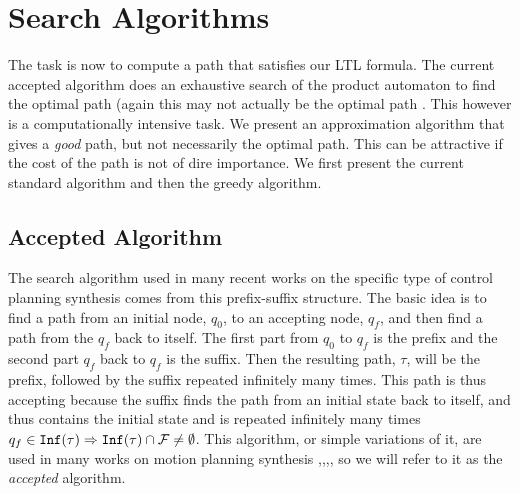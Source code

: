 \chapter{Search Algorithms}
The task is now to compute a path that satisfies our LTL formula. The current accepted algorithm does an exhaustive search of the product automaton to find the optimal path (again this may not actually be the optimal path \cite{schuppan05}. This however is a computationally intensive task. We present an approximation algorithm that gives a \textit{good} path, but not necessarily the optimal path. This can be attractive if the cost of the path is not of dire importance. We first present the current standard algorithm and then the greedy algorithm. 
\section{Accepted Algorithm}
The search algorithm used in many recent works on the specific type of control planning synthesis comes from this prefix-suffix structure. The basic idea is to find a path from an initial node, $q_0$, to an accepting node, $q_f$, and then find a path from the $q_f$ back to itself. The first part from $q_0$ to $q_f$ is the prefix and the second part $q_f$ back to $q_f$ is the suffix. Then the resulting path, $\tau$, will be the prefix, followed by the suffix repeated infinitely many times. This path is thus accepting because the suffix finds the path from an initial state back to itself, and thus contains the initial state and is repeated infinitely many times $q_f \in \texttt{Inf} (\tau)  \Rightarrow \texttt{Inf} (\tau) \cap \mathcal{F} \neq \emptyset$. This algorithm, or simple variations of it, are used in many works on motion planning synthesis \cite{guo15},\cite{fainekos09},\cite{kloetzer08},\cite{smith2010}, so we will refer to it as the \textit{accepted} algorithm. 


